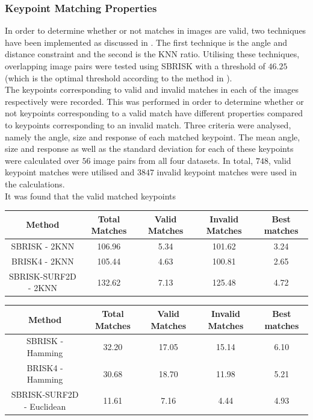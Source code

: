 \documentclass{article}
\begin{document}
\subsubsection{Keypoint Matching Properties}
\label{sec:keypointMatching}
In order to determine whether or not matches in images are valid, two techniques have been implemented as discussed in . The first technique is the angle and distance constraint and the second is the KNN ratio. Utilising these techniques, overlapping image pairs were tested using SBRISK with a threshold of $46.25$ (which is the optimal threshold according to the method in ).\\

The keypoints corresponding to valid and invalid matches in each of the images respectively were recorded. This was performed in order to determine whether or not keypoints corresponding to a valid match have different properties compared to keypoints corresponding to an invalid match. Three criteria were analysed, namely the angle, size and response of each matched keypoint. The mean angle, size and response as well as the standard deviation for each of these keypoints were calculated over $56$ image pairs from all four datasets. In total, $748$, valid keypoint matches were utilised and $3847$ invalid keypoint matches were used in the calculations.\\


It was found that the valid matched keypoints


\begin{table}
\begin{tabular}{|c|c|c|c|c|}
\hline 
Method & Total Matches & Valid Matches & Invalid Matches & Best matches\tabularnewline
\hline 
\hline 
SBRISK - 2KNN & 106.96 & 5.34 & 101.62 & 3.24\tabularnewline
\hline 
BRISK4 - 2KNN & 105.44 & 4.63 & 100.81 & 2.65\tabularnewline
\hline 
SBRISK-SURF2D - 2KNN & 132.62 & 7.13 & 125.48 & 4.72\tabularnewline
\hline 
\end{tabular}
\label{tab:keypointsMatchesKNN}
\end{table}

\begin{table}
\begin{tabular}{|c|c|c|c|c|}
\hline 
Method & Total Matches & Valid Matches & Invalid Matches & Best matches\tabularnewline
\hline 
\hline 
SBRISK - Hamming & 32.20 & 17.05 & 15.14 & 6.10\tabularnewline
\hline 
BRISK4 - Hamming & 30.68 & 18.70 & 11.98 & 5.21\tabularnewline
\hline 
SBRISK-SURF2D - Euclidean & 11.61 & 7.16 & 4.44 & 4.93\tabularnewline
\hline 
\end{tabular}
\label{tab:keypointsMatchesHamming}
\end{table}
\end{document}
